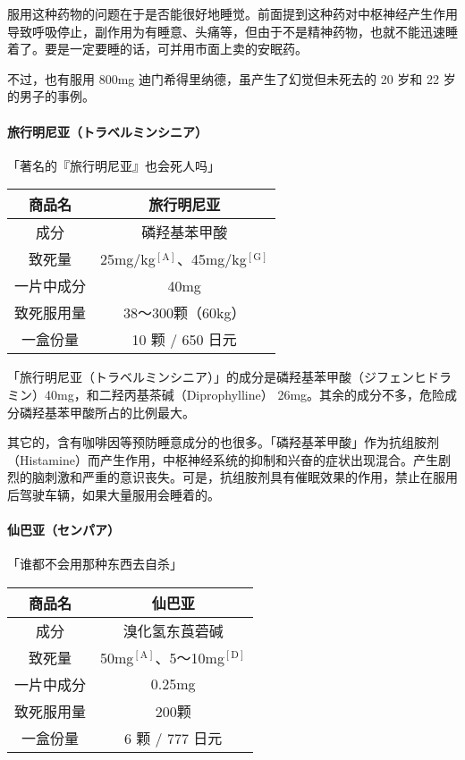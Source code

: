 \documentclass[UTF8]{ctexart}
\begin{document}
服用这种药物的问题在于是否能很好地睡觉。前面提到这种药对中枢神经产生作用导致呼吸停止，副作用为有睡意、头痛等，但由于不是精神药物，也就不能迅速睡着了。要是一定要睡的话，可并用市面上卖的安眠药。

不过，也有服用 800mg 迪门希得里纳德，虽产生了幻觉但未死去的 20 岁和 22 岁的男子的事例。

\paragraph*{旅行明尼亚（トラベルミンシニア）}
\begin{flushright}
「著名的『旅行明尼亚』也会死人吗」
\end{flushright}

\begin{table}[htbp]
\begin{center}
\begin{tabular}{cc}

\toprule
商品名 & 旅行明尼亚 \\
\midrule
成分 & 磷羟基苯甲酸 \\
致死量 & 25mg/kg$^\mathrm{[A]}$、45mg/kg$^\mathrm{[G]}$ \\
一片中成分 & 40mg \\
致死服用量 & 38～300颗（60kg） \\
一盒份量 & 10 颗 / 650 日元 \\
\bottomrule
\end{tabular}
\end{center}
\end{table}

「旅行明尼亚（トラベルミンシニア）」的成分是磷羟基苯甲酸（ジフェンヒドラミン）40mg，和二羟丙基茶碱（Diprophylline）
26mg。其余的成分不多，危险成分磷羟基苯甲酸所占的比例最大。

其它的，含有咖啡因等预防睡意成分的也很多。「磷羟基苯甲酸」作为抗组胺剂（Histamine）而产生作用，中枢神经系统的抑制和兴奋的症状出现混合。产生剧烈的脑刺激和严重的意识丧失。可是，抗组胺剂具有催眠效果的作用，禁止在服用后驾驶车辆，如果大量服用会睡着的。

\paragraph*{仙巴亚（センパア）}
\begin{flushright}
「谁都不会用那种东西去自杀」
\end{flushright}

\begin{table}[htbp]
\begin{center}
\begin{tabular}{cc}

\toprule
商品名 & 仙巴亚 \\
\midrule
成分 & 溴化氢东莨菪碱 \\
致死量 & 50mg$^\mathrm{[A]}$、5～10mg$^\mathrm{[D]}$ \\
一片中成分 & 0.25mg \\
致死服用量 & 200颗 \\
一盒份量 & 6 颗 / 777 日元 \\
\bottomrule
\end{tabular}
\end{center}
\end{table}
\end{document}
